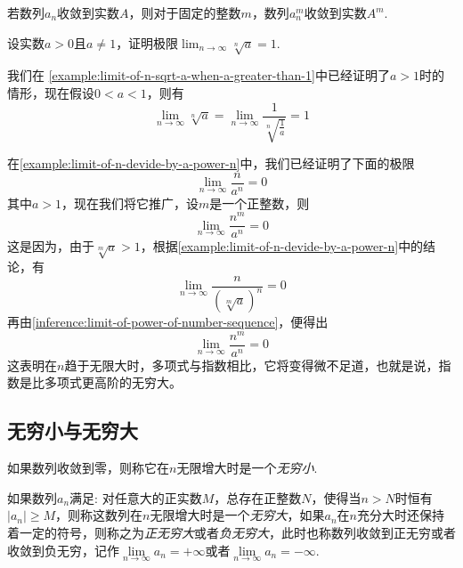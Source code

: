 \begin{inference}
  \label{inference:limit-of-power-of-number-sequence}
  若数列$a_n$收敛到实数$A$，则对于固定的整数$m$，数列$a_n^m$收敛到实数$A^m$.
\end{inference}

\begin{example}
  \label{example:limit-of-n-sqrt-a}
  设实数$a>0$且$a \neq 1$，证明极限$\lim_{n \to \infty} \sqrt[n]{a} = 1$.

  我们在 \autoref{example:limit-of-n-sqrt-a-when-a-greater-than-1}中已经证明了$a>1$时的情形，现在假设$0<a<1$，则有
  \[ \lim_{n \to \infty} \sqrt[n]{a} = \lim_{n \to \infty} \frac{1}{\sqrt[n]{\frac{1}{a}}} = 1 \]
\end{example}

\begin{example}
  \label{example:limit-of-n-power-m-devide-by-a-power-n}
  在\autoref{example:limit-of-n-devide-by-a-power-n}中，我们已经证明了下面的极限
  \[ \lim_{n \to \infty} \frac{n}{a^n} = 0 \]
  其中$a>1$，现在我们将它推广，设$m$是一个正整数，则
  \[ \lim_{n \to \infty} \frac{n^m}{a^n} = 0 \]
  这是因为，由于$\sqrt[m]{a}>1$，根据\autoref{example:limit-of-n-devide-by-a-power-n}中的结论，有
  \[ \lim_{n \to \infty} \frac{n}{(\sqrt[m]{a})^n} = 0 \]
 再由\autoref{inference:limit-of-power-of-number-sequence}，便得出
  \[ \lim_{n \to \infty} \frac{n^m}{a^n} = 0 \]
  这表明在$n$趋于无限大时，多项式与指数相比，它将变得微不足道，也就是说，指数是比多项式更高阶的无穷大。
\end{example}


\subsection{无穷小与无穷大}
\label{sec:infinite-small-and-great}

\begin{definition}
  如果数列收敛到零，则称它在$n$无限增大时是一个\emph{无穷小}.
\end{definition}

\begin{definition}
  如果数列$a_n$满足: 对任意大的正实数$M$，总存在正整数$N$，使得当$n>N$时恒有$|a_n|\geqslant M$，则称这数列在$n$无限增大时是一个\emph{无穷大}，如果$a_n$在$n$充分大时还保持着一定的符号，则称之为\emph{正无穷大}或者\emph{负无穷大}，此时也称数列收敛到正无穷或者收敛到负无穷，记作$\lim\limits_{n \to \infty} a_n = + \infty$或者$\lim\limits_{n \to \infty} a_n = -\infty$.
\end{definition}

